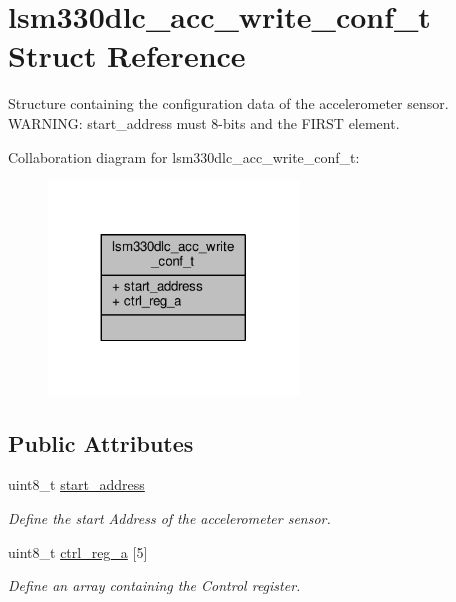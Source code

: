 \hypertarget{structlsm330dlc__acc__write__conf__t}{\section{lsm330dlc\+\_\+acc\+\_\+write\+\_\+conf\+\_\+t Struct Reference}
\label{structlsm330dlc__acc__write__conf__t}
}


Structure containing the configuration data of the accelerometer sensor. W\+A\+R\+N\+I\+N\+G\+: start\+\_\+address must 8-\/bits and the F\+I\+R\+S\+T element.  




Collaboration diagram for lsm330dlc\+\_\+acc\+\_\+write\+\_\+conf\+\_\+t\+:
\nopagebreak
\begin{figure}[H]
\begin{center}
\leavevmode
\includegraphics[width=188pt]{structlsm330dlc__acc__write__conf__t__coll__graph}
\end{center}
\end{figure}
\subsection*{Public Attributes}
\begin{DoxyCompactItemize}
\item 
\hypertarget{structlsm330dlc__acc__write__conf__t_a6ebaaecb2cbdc1ca76c856ab47b73b52}{uint8\+\_\+t \hyperlink{structlsm330dlc__acc__write__conf__t_a6ebaaecb2cbdc1ca76c856ab47b73b52}{start\+\_\+address}}\label{structlsm330dlc__acc__write__conf__t_a6ebaaecb2cbdc1ca76c856ab47b73b52}

\begin{DoxyCompactList}\small\item\em Define the start Address of the accelerometer sensor. \end{DoxyCompactList}\item 
\hypertarget{structlsm330dlc__acc__write__conf__t_a814e816e7771b0f8aa1e0aba8e61ce7e}{uint8\+\_\+t \hyperlink{structlsm330dlc__acc__write__conf__t_a814e816e7771b0f8aa1e0aba8e61ce7e}{ctrl\+\_\+reg\+\_\+a} \mbox{[}5\mbox{]}}\label{structlsm330dlc__acc__write__conf__t_a814e816e7771b0f8aa1e0aba8e61ce7e}

\begin{DoxyCompactList}\small\item\em Define an array containing the Control register. \end{DoxyCompactList}\end{DoxyCompactItemize}


